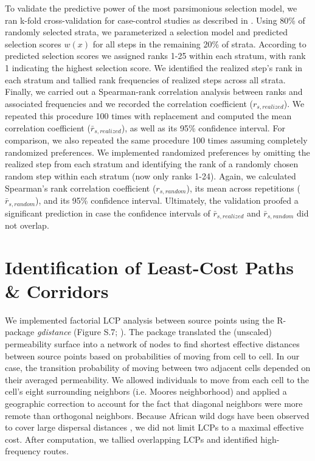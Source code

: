\documentclass[abstract=off,10pt,a4paper,bibliography=totocnumbered]{article}
\begin{document}
To validate the predictive power of the most parsimonious selection model, we
ran k-fold cross-validation for case-control studies as described in
\cite{Fortin.2009}. Using 80\% of randomly selected strata, we parameterized a
selection model and predicted selection scores \(w(x)\) for all steps in the
remaining 20\% of strata. According to predicted selection scores we assigned
ranks 1-25 within each stratum, with rank 1 indicating the highest selection
score. We identified the realized step's rank in each stratum and tallied rank
frequencies of realized steps across all strata. Finally, we carried out a
Spearman-rank correlation analysis between ranks and associated frequencies and
we recorded the correlation coefficient (\(r_{s, realized}\)). We repeated this
procedure 100 times with replacement and computed the mean correlation
coefficient (\(\bar{r}_{s, realized}\)), as well as its 95\% confidence
interval. For comparison, we also repeated the same procedure 100 times assuming
completely randomized preferences. We implemented randomized preferences by
omitting the realized step from each stratum and identifying the rank of a
randomly chosen random step within each stratum (now only ranks 1-24). Again, we
calculated Spearman's rank correlation coefficient (\(r_{s, random}\)), its mean
across repetitions (\(\bar{r}_{s, random}\)), and its 95\% confidence interval.
Ultimately, the validation proofed a significant prediction in case the
confidence intervals of \(\bar{r}_{s, realized}\) and \(\bar{r}_{s, random}\)
did not overlap.

\newpage
\section{Identification of Least-Cost Paths \& Corridors}
We implemented factorial LCP analysis between source points using the R-package
\textit{gdistance} (Figure S.7; \citealp{vanEtten.2017}). The package translated
the (unscaled) permeability surface into a network of nodes to find shortest
effective distances between source points based on probabilities of moving from
cell to cell. In our case, the transition probability of moving between two
adjacent cells depended on their averaged permeability. We allowed individuals
to move from each cell to the cell's eight surrounding neighbors (i.e. Moores
neighborhood) and applied a geographic correction to account for the fact that
diagonal neighbors were more remote than orthogonal neighbors. Because African
wild dogs have been observed to cover large dispersal distances
\citep{DaviesMostert.2012, Masenga.2016, Cozzi.2020}, we did not limit LCPs to a
maximal effective cost. After computation, we tallied overlapping LCPs and
identified high-frequency routes.
\end{document}

